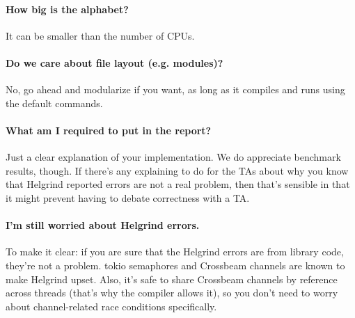 \documentclass[12pt]{article}
\renewcommand{\_}{\kern-1.5pt\textunderscore\kern-1.5pt}
\begin{document}
\paragraph{How big is the alphabet?} It can be smaller than the number of CPUs.

\paragraph{Do we care about file layout (e.g. modules)?} No, go ahead and modularize if you want, as long as it compiles and runs using the default commands.

\paragraph{What am I required to put in the report?} Just a clear explanation of your implementation. We do appreciate benchmark results, though. If there’s any explaining to do for the TAs about why you know that Helgrind reported errors are not a real problem, then that’s sensible in that it might prevent having to debate correctness with a TA.

\paragraph{I'm still worried about Helgrind errors.} To make it clear: if you are sure that the Helgrind errors are from library code, they're not a problem. tokio semaphores and Crossbeam channels are known to make Helgrind upset. Also, it's safe to share Crossbeam channels by reference across threads (that's why the compiler allows it), so you don't need to worry about channel-related race conditions specifically.

\vspace{\baselineskip}

\end{document}
